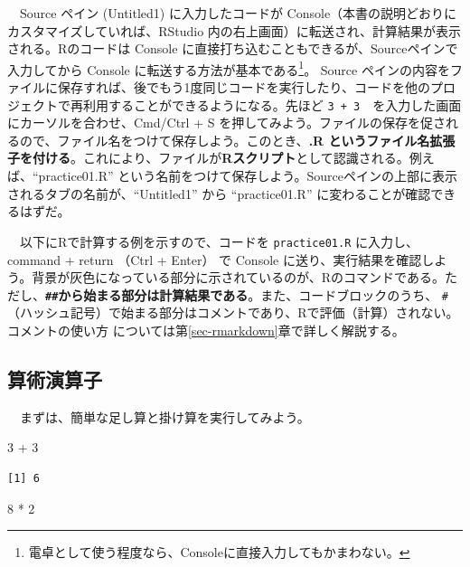 \documentclass[
  a4paper,
  pandoc,
  ja=standard,
  jafont=haranoaji]{bxjsbook}
\newenvironment{Shaded}{\begin{snugshade}}{\end{snugshade}}
\newcommand{\DecValTok}[1]{\textcolor[rgb]{0.68,0.00,0.00}{#1}}
\newcommand{\SpecialCharTok}[1]{\textcolor[rgb]{0.37,0.37,0.37}{#1}}
\begin{document}
　Source ペイン (Untitled1) に入力したコードが
Console（本書の説明どおりにカスタマイズしていれば、RStudio
内の右上画面）に転送され、計算結果が表示される。Rのコードは Console
に直接打ち込むこともできるが、Sourceペインで入力してから Console
に転送する方法が基本である\footnote{電卓として使う程度なら、Consoleに直接入力してもかまわない。}。
Source
ペインの内容をファイルに保存すれば、後でもう1度同じコードを実行したり、コードを他のプロジェクトで再利用することができるようになる。先ほど
\texttt{3\ +\ 3}　を入力した画面にカーソルを合わせ、Cmd/Ctrl + S
を押してみよう。ファイルの保存を促されるので、ファイル名をつけて保存しよう。このとき、\textbf{.R
というファイル名拡張子を付ける}。これにより、ファイルが\textbf{Rスクリプト}として認識される。例えば、``practice01.R''
という名前をつけて保存しよう。Sourceペインの上部に表示されるタブの名前が、``Untitled1''
から ``practice01.R'' に変わることが確認できるはずだ。

　以下にRで計算する例を示すので、コードを \texttt{practice01.R}
に入力し、command + return （Ctrl + Enter） で Console
に送り、実行結果を確認しよう。背景が灰色になっている部分に示されているのが、Rのコマンドである。ただし、\textbf{\texttt{\#\#}から始まる部分は計算結果である}。また、コードブロックのうち、
\texttt{\#}（ハッシュ記号）で始まる部分はコメントであり、Rで評価（計算）されない。コメントの使い方
については第\ref{sec-rmarkdown}章で詳しく解説する。

\hypertarget{ux7b97ux8853ux6f14ux7b97ux5b50}{%
\subsection{算術演算子}\label{ux7b97ux8853ux6f14ux7b97ux5b50}}

　まずは、簡単な足し算と掛け算を実行してみよう。

\begin{Shaded}
\begin{Highlighting}[numbers=left,,]
\DecValTok{3} \SpecialCharTok{+} \DecValTok{3}
\end{Highlighting}
\end{Shaded}

\begin{verbatim}
[1] 6
\end{verbatim}

\begin{Shaded}
\begin{Highlighting}[numbers=left,,]
\DecValTok{8} \SpecialCharTok{*} \DecValTok{2}
\end{Highlighting}
\end{Shaded}
\end{document}
